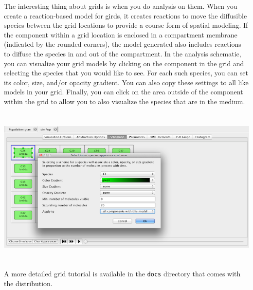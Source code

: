\documentclass[titlepage,11pt]{article}
\begin{document}
The interesting thing about grids is when you do analysis on them.  When you create a reaction-based model for girds, it creates reactions to move the diffusible species between the grid locations to provide a course form of spatial modeling.  If the component within a grid location is enclosed in a compartment membrane (indicated by the rounded corners), the model generated also includes reactions to diffuse the species in and out of the compartment.  In the analysis schematic, you can visualize your grid models by clicking on the component in the grid and selecting the species that you would like to see.  For each such species, you can set its color, size, and/or opacity gradient.  You can also copy these settings to all like models in your grid.  Finally, you can click on the area outside of the component within the grid to allow you to also visualize the species that are in the medium.

\begin{center}
\includegraphics[height=80mm]{screenshots/compAppearances}
\end{center}

\noindent
A more detailed 
grid tutorial
is available in the {\tt docs} directory that comes with the distribution.
\end{document}
